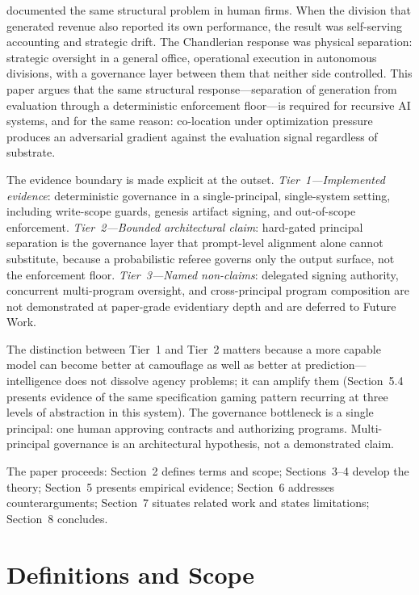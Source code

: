 \documentclass[11pt]{article}
\begin{document}
\citet{chandler1962} documented the same structural problem in human firms. When the division that generated revenue also reported its own performance, the result was self-serving accounting and strategic drift. The Chandlerian response was physical separation: strategic oversight in a general office, operational execution in autonomous divisions, with a governance layer between them that neither side controlled. This paper argues that the same structural response---separation of generation from evaluation through a deterministic enforcement floor---is required for recursive AI systems, and for the same reason: co-location under optimization pressure produces an adversarial gradient against the evaluation signal regardless of substrate.

The evidence boundary is made explicit at the outset. \emph{Tier~1---Implemented evidence}: deterministic governance in a single-principal, single-system setting, including write-scope guards, genesis artifact signing, and out-of-scope enforcement. \emph{Tier~2---Bounded architectural claim}: hard-gated principal separation is the governance layer that prompt-level alignment alone cannot substitute, because a probabilistic referee governs only the output surface, not the enforcement floor. \emph{Tier~3---Named non-claims}: delegated signing authority, concurrent multi-program oversight, and cross-principal program composition are not demonstrated at paper-grade evidentiary depth and are deferred to Future Work.

The distinction between Tier~1 and Tier~2 matters because a more capable model can become better at camouflage as well as better at prediction---intelligence does not dissolve agency problems; it can amplify them (Section~5.4 presents evidence of the same specification gaming pattern recurring at three levels of abstraction in this system). The governance bottleneck is a single principal: one human approving contracts and authorizing programs. Multi-principal governance is an architectural hypothesis, not a demonstrated claim.

The paper proceeds: Section~2 defines terms and scope; Sections~3--4 develop the theory; Section~5 presents empirical evidence; Section~6 addresses counterarguments; Section~7 situates related work and states limitations; Section~8 concludes.


\section{Definitions and Scope}
\end{document}
